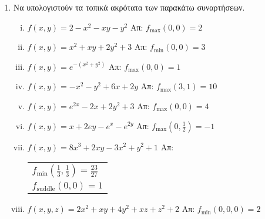 


\thispagestyle{askhseis}



\begin{center}
  \minibox{\large\bfseries \textcolor{Col1}{Ασκήσεις στα Ακρότατα και Ακρότατα με
  Περιορισμό}}
\end{center}

\vspace{\baselineskip}

\begin{enumerate}
  \item Να υπολογιστούν τα τοπικά ακρότατα των παρακάτω συναρτήσεων.
    \begin{enumerate}[i)]

      \item $ f(x,y) = 2 - x^{2} - xy - y^{2} $ \hfill Απ: 
        $ f_{\text{max}}(0,0) = 2 $

      \item $ f(x,y) = x^{2} + xy + 2y^{2} + 3 $ \hfill Απ: 
        $ f_{\text{min}}(0,0) = 3 $

      \item $ f(x,y) = e^{-(x^{2} + y^{2})} $ \hfill Απ: 
        $ f_{\text{max}}(0,0) = 1  $

      \item $ f(x,y) = -x^{2} - y^{2} + 6x + 2y $ \hfill Απ: 
        $ f_{\text{max}}(3,1) = 10 $ 

      \item $ f(x,y) = e^{2x} - 2x + 2y^{2} + 3 $ \hfill Απ: 
        $ f_{\text{max}}(0,0) =4  $ 

      \item $ f(x,y) = x + 2ey - e^{x} - e^{2y} $ \hfill Απ: 
        $ f_{\text{max}}\left(0, \frac{1}{2}\right) = -1 $

      \item $ f(x,y) = 8x^{3} + 2xy - 3x^{2} + y^{2} + 1 $ \hfill Απ: 
        \begin{tabular}{l}
          $ f_{\text{min}}\left(\frac{1}{3}, \frac{1}{3}\right) = 
          \frac{23}{27} $ \\ 
          $ f_{\text{suddle}}(0,0) = 1 $
        \end{tabular}

      \item $ f(x,y,z) = 2x^{2} + xy + 4y^{2} + xz + z^{2} + 2  $ \hfill Απ: 
        $ f_{\text{min}}(0,0,0) = 2 $

    \end{enumerate}


\end{enumerate}
